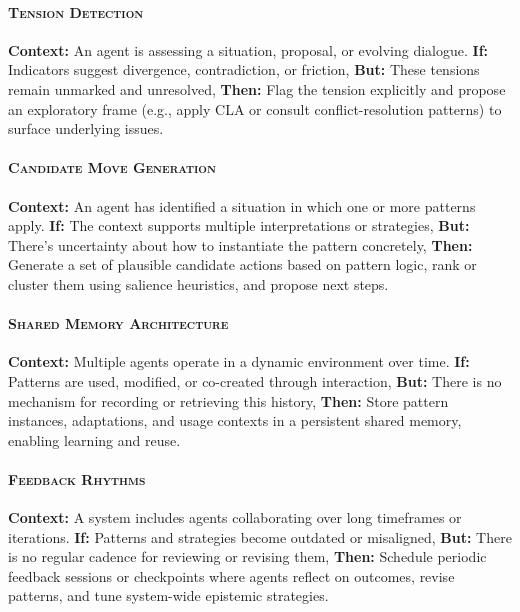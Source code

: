 \documentclass[acmlarge,timestamp]{acmart}
\begin{document}
{ \paragraph*{{\scshape Tension Detection}}

\noindent \textbf{Context:} An agent is assessing a situation, proposal, or evolving dialogue.
 \textbf{If:} Indicators suggest divergence, contradiction, or friction,
 \textbf{But:} These tensions remain unmarked and unresolved,
 \textbf{Then:} Flag the tension explicitly and propose an exploratory frame (e.g., apply CLA or consult conflict-resolution patterns) to surface underlying issues.

 \paragraph*{{\scshape Candidate Move Generation}}

\noindent \textbf{Context:} An agent has identified a situation in which one or more patterns apply.
 \textbf{If:} The context supports multiple interpretations or strategies,
 \textbf{But:} There’s uncertainty about how to instantiate the pattern concretely,
 \textbf{Then:} Generate a set of plausible candidate actions based on pattern logic, rank or cluster them using salience heuristics, and propose next steps.

 \paragraph*{{\scshape Shared Memory Architecture}}

\noindent \textbf{Context:} Multiple agents operate in a dynamic environment over time.
 \textbf{If:} Patterns are used, modified, or co-created through interaction,
 \textbf{But:} There is no mechanism for recording or retrieving this history,
 \textbf{Then:} Store pattern instances, adaptations, and usage contexts in a persistent shared memory, enabling learning and reuse.

 \paragraph*{{\scshape Feedback Rhythms}}

\noindent \textbf{Context:} A system includes agents collaborating over long timeframes or iterations.
 \textbf{If:} Patterns and strategies become outdated or misaligned,
 \textbf{But:} There is no regular cadence for reviewing or revising them,
 \textbf{Then:} Schedule periodic feedback sessions or checkpoints where agents reflect on outcomes, revise patterns, and tune system-wide epistemic strategies.

}
\end{document}
